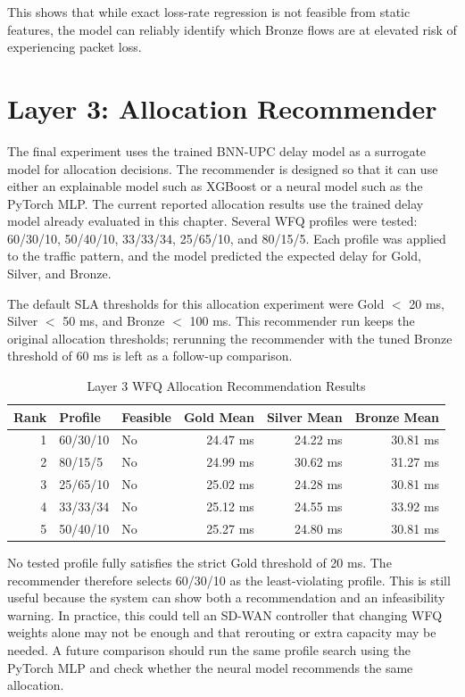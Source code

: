 \documentclass[a4paper,12pt]{Classes/RoboticsLaTeX}
\begin{document}
This shows that while exact loss-rate regression is not feasible from static features, the model can reliably identify which Bronze flows are at elevated risk of experiencing packet loss.

\section{Layer 3: Allocation Recommender}

The final experiment uses the trained BNN-UPC delay model as a surrogate model for allocation decisions. The recommender is designed so that it can use either an explainable model such as XGBoost or a neural model such as the PyTorch MLP. The current reported allocation results use the trained delay model already evaluated in this chapter. Several WFQ profiles were tested: 60/30/10, 50/40/10, 33/33/34, 25/65/10, and 80/15/5. Each profile was applied to the traffic pattern, and the model predicted the expected delay for Gold, Silver, and Bronze.

The default SLA thresholds for this allocation experiment were Gold $<$ 20 ms, Silver $<$ 50 ms, and Bronze $<$ 100 ms. This recommender run keeps the original allocation thresholds; rerunning the recommender with the tuned Bronze threshold of 60 ms is left as a follow-up comparison.

\begin{table}[H]
\centering
\caption{Layer 3 WFQ Allocation Recommendation Results}
\label{tab:allocation_results}
\begin{tabular}{|r|l|l|r|r|r|}
\hline
\textbf{Rank} & \textbf{Profile} & \textbf{Feasible} & \textbf{Gold Mean} & \textbf{Silver Mean} & \textbf{Bronze Mean} \\
\hline
1 & 60/30/10 & No & 24.47 ms & 24.22 ms & 30.81 ms \\
\hline
2 & 80/15/5 & No & 24.99 ms & 30.62 ms & 31.27 ms \\
\hline
3 & 25/65/10 & No & 25.02 ms & 24.28 ms & 30.81 ms \\
\hline
4 & 33/33/34 & No & 25.12 ms & 24.55 ms & 33.92 ms \\
\hline
5 & 50/40/10 & No & 25.27 ms & 24.80 ms & 30.81 ms \\
\hline
\end{tabular}
\end{table}

No tested profile fully satisfies the strict Gold threshold of 20 ms. The recommender therefore selects 60/30/10 as the least-violating profile. This is still useful because the system can show both a recommendation and an infeasibility warning. In practice, this could tell an SD-WAN controller that changing WFQ weights alone may not be enough and that rerouting or extra capacity may be needed. A future comparison should run the same profile search using the PyTorch MLP and check whether the neural model recommends the same allocation.
\end{document}
